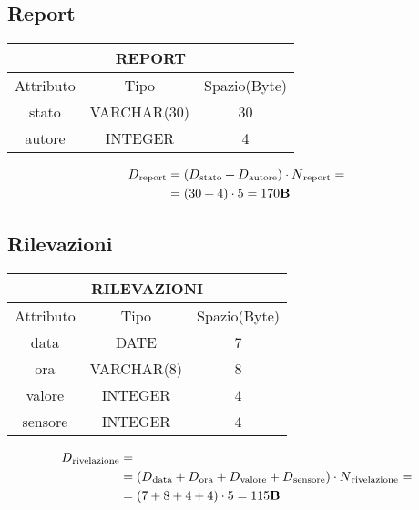 \subsection{Report}
\begin{tabular}{|c|c|c|}
  \hline
  \multicolumn{3}{|c|}{\textbf{REPORT}}\\
  \hline
  Attributo & Tipo & Spazio(Byte) \\
  \hline
  stato & VARCHAR(30) & 30 \\
  autore & INTEGER & 4\\
  \hline
\end{tabular}
\begin{equation}
  \begin{aligned}
    D{\text{\textsubscript{report}}} &=(D{\text{\textsubscript{stato}}}+D{\text{\textsubscript{autore}}})\cdot N{\text{\textsubscript{report}}}=\\
    &=(30+4)\cdot 5 = 170\textbf{B}
  \end{aligned}
\end{equation}
\subsection{Rilevazioni}
\begin{tabular}{|c|c|c|}
  \hline
  \multicolumn{3}{|c|}{\textbf{RILEVAZIONI}}\\
  \hline
  Attributo & Tipo & Spazio(Byte) \\
  \hline
  data & DATE & 7 \\
  ora & VARCHAR(8)  & 8\\
  valore & INTEGER & 4 \\
  sensore & INTEGER & 4 \\
  \hline
\end{tabular}
\begin{equation}
  \begin{aligned}
    D{\text{\textsubscript{rivelazione}}} &=\\
    &=(D{\text{\textsubscript{data}}}+D{\text{\textsubscript{ora}}}+D{\text{\textsubscript{valore}}}+D{\text{\textsubscript{sensore}}})\cdot N{\text{\textsubscript{rivelazione}}}=\\
    &=(7+8+4+4)\cdot 5 = 115\textbf{B}
  \end{aligned}
\end{equation}
